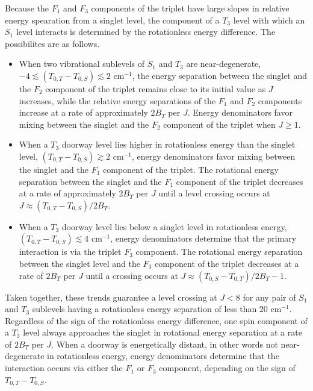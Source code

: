 \documentclass[12pt]{mitthesis}
\newcommand{\rcm}{cm$^{-1}$}
\begin{document}
Because the $F_1$ and $F_3$ components of the triplet have large
slopes in relative energy spearation from a singlet level, the
component of a $T_3$ level with which an $S_1$ level interacts is
determined by the rotationless energy difference.  The possibilites
are as follows.
\begin{itemize}
\item When two vibrational sublevels of $S_1$ and $T_3$ are
  near-degenerate, $-4 \lesssim (T_{0,T} - T_{0,S}) \lesssim 2$ \rcm,
  the energy separation between the singlet and the $F_2$ component of
  the triplet remains close to its initial value as $J$ increases,
  while the relative energy separations of the $F_1$ and $F_2$
  components increase at a rate of approximately $2B_T$ per $J$.
  Energy denominators favor mixing between the singlet and the $F_2$
  component of the triplet when $J \ge 1$.
\item When a $T_3$ doorway level lies higher in rotationless energy
  than the singlet level, $ (T_{0,T} - T_{0,S}) \gtrsim 2$ \rcm,
  energy denominators favor mixing between the singlet and the $F_1$
  component of the triplet.  The rotational energy separation between
  the singlet and the $F_1$ component of the triplet decreases at a
  rate of approximately $2B_T$ per $J$ until a level crossing occurs
  at $J \approx (T_{0,T} - T_{0,S}) / 2 B_T$.
\item When a $T_3$ doorway level lies below a singlet level in
  rotationless energy, $(T_{0,T} - T_{0,S}) \lesssim 4$ \rcm, energy
  denominators determine that the primary interaction is via the
  triplet $F_3$ component.  The rotational energy separation between
  the singlet level and the $F_3$ component of the triplet decreases
  at a rate of $2B_T$ per $J$ until a crossing occurs at $J \approx
  (T_{0,S} - T_{0,T}) / 2 B_T - 1$.
\end{itemize}
Taken together, these trends guarantee a level crossing at $J<8$ for
any pair of $S_1$ and $T_3$ sublevels having a rotationless energy
separation of less than 20 \rcm.  Regardless of the sign of the
rotationless energy difference, one spin component of a $T_3$ level
always approaches the singlet in rotational energy separation at a
rate of $2B_T$ per $J$.  When a doorway is energetically distant, in
other words not near-degenerate in rotationless energy, energy
denominators determine that the interaction occurs via either the
$F_1$ or $F_3$ component, depending on the sign of $T_{0,T} - T_{0,S}$.
\end{document}

